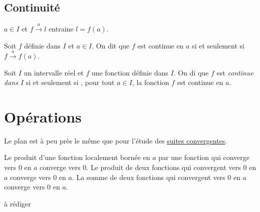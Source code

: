\subsection{Continuité}
\begin{rem}
 $a\in I$ et  $f\xrightarrow{a}l$ entraine $l=f(a)$.
\end{rem}
\begin{defi}
  Soit $f$ définie dans $I$ et $a\in I$. On dit que $f$ est continue en $a$ si et seulement si $f\xrightarrow{a}f(a)$.
\end{defi}
\begin{defi}
 Soit $I$ un intervalle réel et $f$ une fonction définie dans $I$. On di que $f$ est \emph{continue dans $I$} si et seulement si , pour tout $a\in I$, la fonction $f$ est continue en $a$.
\end{defi}


\section{Opérations}
Le plan est à peu près le même que pour l'étude des \href{\baseurl C2069.pdf}{suites convergentes}.
\begin{prop}
  Le produit d'une fonction localement bornée en $a$ par une fonction qui converge vers $0$ en $a$ converge vers $0$. Le produit de deux fonctions qui convergent vers $0$ en $a$ converge vers $0$ en $a$. La somme de deux fonctions qui convergent vers $0$ en $a$ converge vers $0$ en $a$.
\end{prop}
\begin{demo}
  à rédiger
\end{demo}

